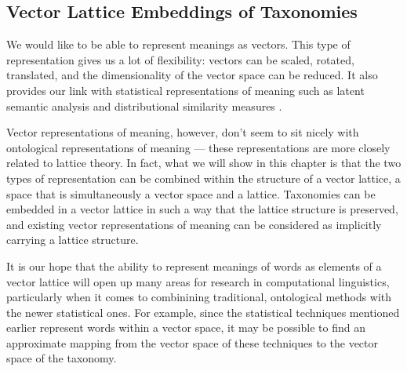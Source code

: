 \documentclass{report}
\begin{document}


\subsection{Vector Lattice Embeddings of Taxonomies}

We would like to be able to represent meanings as vectors. This type of representation gives us a lot of flexibility: vectors can be scaled, rotated, translated, and the dimensionality of the vector space can be reduced. It also provides our link with statistical representations of meaning such as latent semantic analysis \citep{Deerwester:90} and distributional similarity measures \citep{Lee:99}.

Vector representations of meaning, however, don't seem to sit nicely with ontological representations of meaning --- these representations are more closely related to lattice theory. In fact, what we will show in this chapter is that the two types of representation can be combined within the structure of a vector lattice, a space that is simultaneously a vector space and a lattice. Taxonomies can be embedded in a vector lattice in such a way that the lattice structure is preserved, and existing vector representations of meaning can be considered as implicitly carrying a lattice structure.

It is our hope that the ability to represent meanings of words as elements of a vector lattice will open up many areas for research in computational linguistics, particularly when it comes to combinining traditional, ontological methods with the newer statistical ones. For example, since the statistical techniques mentioned earlier represent words within a vector space, it may be possible to find an approximate mapping from the vector space of these techniques to the vector space of the taxonomy.
\end{document}
